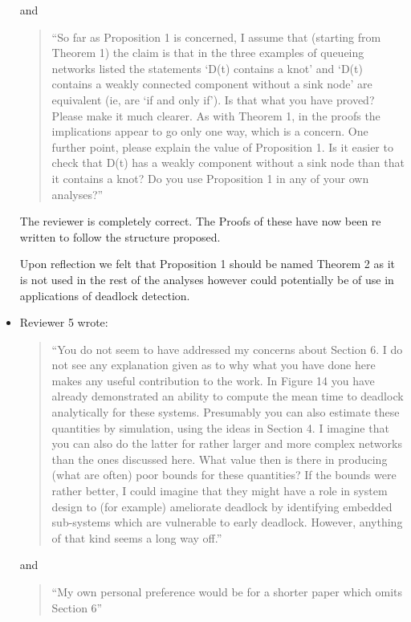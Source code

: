 \documentclass{article}
\begin{document}
\begin{itemize}
and

\begin{quote}
``So far as Proposition 1 is concerned, I assume that (starting from Theorem 1)
the claim is that in the three examples of queueing networks listed the
statements ‘D(t) contains a knot’ and ‘D(t) contains a weakly connected
component without a sink node’ are equivalent (ie, are ‘if and only if’). Is
that what you have proved? Please make it much clearer. As with Theorem 1, in
the proofs the implications appear to go only one way, which is a concern. One
further point, please explain the value of Proposition 1. Is it easier to check
that D(t) has a weakly component without a sink node than that it contains a
knot? Do you use Proposition 1 in any of your own analyses?''
\end{quote}

The reviewer is completely correct.
The Proofs of these have now been re written  to follow the structure proposed.

Upon reflection we felt that Proposition 1 should be named Theorem 2 as it is
not used in the rest of the analyses however could potentially be of use in
applications of deadlock detection.

\item Reviewer 5 wrote:
\begin{quote}
``You do not seem to have addressed my concerns about Section 6. I do not see
any explanation given as to why what you have done here makes any useful
contribution to the work. In Figure 14 you have already demonstrated an ability
to compute the mean time to deadlock analytically for these systems.
Presumably you can also estimate these quantities by simulation, using the ideas
in Section 4. I imagine that you can also do the latter for rather larger and
more complex networks than the ones discussed here. What value then is there in
producing (what are often) poor bounds for these quantities? If the bounds were
rather better, I could imagine that they might have a role in system design to
(for example) ameliorate deadlock by identifying embedded sub-systems which are
vulnerable to early deadlock. However, anything of that kind seems a long way
off.''
\end{quote}

and

\begin{quote}
``My own personal preference would be for a shorter paper which omits Section
6''
\end{quote}


\end{itemize}
\end{document}
